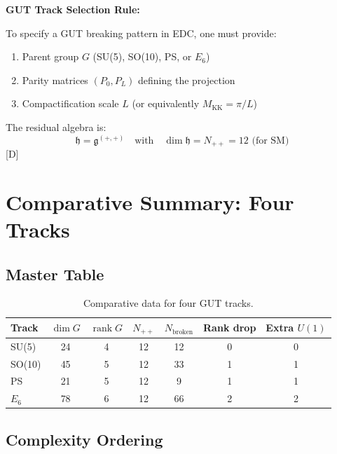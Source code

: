 \documentclass[11pt,a4paper]{article}
\newcommand{\tagD}{\textcolor{blue!70!black}{[D]}}
\DeclareMathOperator{\rank}{rank}
\begin{document}
\begin{designrule}
\textbf{GUT Track Selection Rule:}

To specify a GUT breaking pattern in EDC, one must provide:
\begin{enumerate}
    \item Parent group $G$ (SU(5), SO(10), PS, or $E_6$)
    \item Parity matrices $(P_0, P_L)$ defining the projection
    \item Compactification scale $L$ (or equivalently $M_{\text{KK}} = \pi/L$)
\end{enumerate}

The residual algebra is:
\begin{equation}
\label{eq:design-rule}
\mathfrak{h} = \mathfrak{g}^{(+,+)} \quad \text{with} \quad
\dim \mathfrak{h} = N_{++} = 12 \text{ (for SM)}
\end{equation}
\tagD
\end{designrule}

\section{Comparative Summary: Four Tracks}

\subsection{Master Table}

\begin{table}[h]
\centering
\begin{tabular}{lcccccc}
\toprule
Track & $\dim G$ & $\rank G$ & $N_{++}$ & $N_{\text{broken}}$ & Rank drop & Extra $U(1)$ \\
\midrule
SU(5) & 24 & 4 & 12 & 12 & 0 & 0 \\
SO(10) & 45 & 5 & 12 & 33 & 1 & 1 \\
PS & 21 & 5 & 12 & 9 & 1 & 1 \\
$E_6$ & 78 & 6 & 12 & 66 & 2 & 2 \\
\bottomrule
\end{tabular}
\caption{Comparative data for four GUT tracks.}
\label{tab:master}
\end{table}

\subsection{Complexity Ordering}
\end{document}

